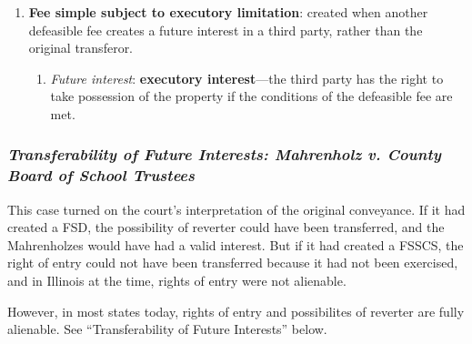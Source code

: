 \begin{enumerate}
\begin{enumerate}
        simple that does not automatically terminate but \emph{may be cut 
        short} or divested at the transferor's election when a stated 
        condition happens.''\footnote{Casebook p. 224.} It is created by 
        conditional language---``but if,'' ``provided,'' ''on condition 
        that.'' 
        \begin{enumerate}
            \item \emph{Future interest}: \textbf{Right of entry} (or power of 
            termination)---O can exercise his right to reclaim possession of 
            the property, but there will not be an automatic conveyance.
        \end{enumerate}
        \item \textbf{Fee simple subject to executory limitation}: created 
        when another defeasible fee creates a future interest in a third 
        party, rather than the original transferor.
        \begin{enumerate}
            \item \emph{Future interest}: \textbf{executory interest}---the 
            third party has the right to take possession of the property if 
            the conditions of the defeasible fee are met.
        \end{enumerate}
    \end{enumerate}
\end{enumerate}

\subsubsection{\emph{Transferability of Future Interests: Mahrenholz v. County 
Board of School Trustees}}

This case turned on the court's interpretation of the original conveyance. If 
it had created a FSD, the possibility of reverter could have been transferred, 
and the Mahrenholzes would have had a valid interest. But if it had created a 
FSSCS, the right of entry could not have been transferred because it had not 
been exercised, and in Illinois at the time, rights of entry were not 
alienable.

However, in most states today, rights of entry and possibilites of reverter 
are fully alienable. See ``Transferability of Future Interests'' below.

